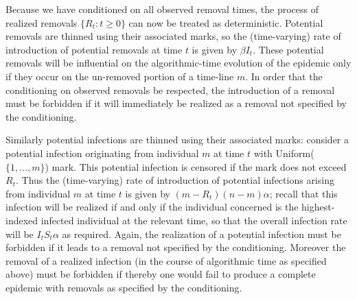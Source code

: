 \documentclass[]{article}
\begin{document}
 Because we have conditioned on all observed removal times, the process of realized removals \(\{R_t:t\geq0\}\) can now be treated as deterministic.
 Potential removals are thinned using their associated marks, so the (time-varying) rate of introduction of potential removals at time \(t\) is given by \(\beta I_t\).%
 These potential removals will be influential on the algorithmic-time evolution of the epidemic only if they occur on the un-removed portion of a  time-line \(m\).
 In order that the conditioning on observed removals be respected,
 the introduction of a removal must be forbidden if it will immediately be realized as a removal not specified by the conditioning.%
 
 
 Similarly potential infections are thinned using their associated marks: 
 consider a potential infection originating from individual \(m\) at time \(t\) with Uniform(\(\{1, \ldots, m\}\)) mark.
 This potential infection is censored if the mark does not exceed \(R_t\). 
 Thus the (time-varying) rate of introduction of potential infections arising from individual \(m\) at time \(t\) is given by \((m-R_t)(n-m)\alpha\);
 recall that this infection will be realized if and only if the individual concerned is the highest-indexed infected individual at the relevant time, so that the overall infection rate will be \(I_t S_t\alpha\) as required.
 Again, the realization of a potential infection must be forbidden if it leads to a removal not specified by the conditioning.
 Moreover the removal of a realized infection (in the course of algorithmic time as specified above) must be forbidden if thereby one would fail to produce a complete epidemic with removals as specified by the conditioning.
\end{document}
